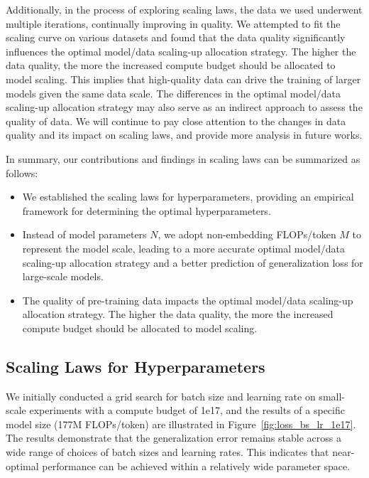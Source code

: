 Additionally, in the process of exploring scaling laws, the data we used underwent multiple iterations, continually improving in quality. We attempted to fit the scaling curve on various datasets and found that the data quality significantly influences the optimal model/data scaling-up allocation strategy. The higher the data quality, the more the increased compute budget should be allocated to model scaling. This implies that high-quality data can drive the training of larger models given the same data scale. The differences in the optimal model/data scaling-up allocation strategy may also serve as an indirect approach to assess the quality of data. We will continue to pay close attention to the changes in data quality and its impact on scaling laws, and provide more analysis in future works. 

In summary, our contributions and findings in scaling laws can be summarized as follows:

\begin{itemize}
    \item We established the scaling laws for hyperparameters, providing an empirical framework for determining the optimal hyperparameters.
    \item Instead of model parameters $N$, we adopt non-embedding FLOPs/token $M$ to represent the model scale, leading to a more accurate optimal model/data scaling-up allocation strategy and a better prediction of generalization loss for large-scale models.
    \item The quality of pre-training data impacts the optimal model/data scaling-up allocation strategy. The higher the data quality, the more the increased compute budget should be allocated to model scaling.
\end{itemize}

\subsection{Scaling Laws for Hyperparameters} We initially conducted a grid search for batch size and learning rate on small-scale experiments with a compute budget of 1e17, and the results of a specific model size (177M FLOPs/token) are illustrated in Figure~\ref{fig:loss_bs_lr_1e17}. The results demonstrate that the generalization error remains stable across a wide range of choices of batch sizes and learning rates. This indicates that near-optimal performance can be achieved within a relatively wide parameter space.

